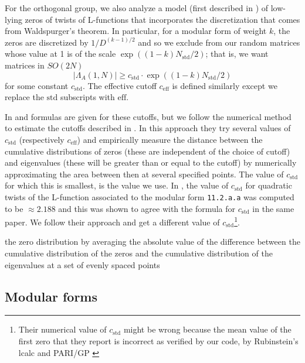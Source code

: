\documentclass[11pt]{amsart}
\newcommand     {\abs}[1]       {{\left\lvert{#1}\right\rvert}}
\newcommand{\eff}{\textrm{eff}}
\newcommand{\std}{\textrm{std}}
\begin{document}
For the orthogonal group, we also analyze a model (first described in \cite{DHKMS}) of low-lying zeros of twists of L-functions that incorporates the discretization that comes from Waldspurger's theorem.  In particular, for a modular form of weight $k$, the zeros are discretized by $1/D^{(k-1)/2}$ and so we exclude from our random matrices whose value at 1 is of the scale $\exp((1-k)N_\std/2)$; that is, we want matrices in $SO(2N)$
\[
\abs{\Lambda_A(1,N)} \geq c_\std\cdot \exp((1-k)N_\std/2)
\]
for some constant $c_\std$.  The effective cutoff $c_\eff$ is defined similarly except we replace the $\std$ subscripts with $\eff$.  

In \cite{DHKMS} and \cite{bm} formulas are given for these cutoffs, but we follow the numerical method to estimate the cutoffs described in \cite{DHKMS}.  In this approach they try several values of $c_\std$ (respectively $c_\eff$) and empirically measure the distance between the cumulative distributions of zeros (these are independent of the choice of cutoff) and eigenvalues (these will be greater than or equal to the cutoff) by numerically approximating the area between then at several specified points.  The value of $c_\std$ for which this is smallest, is the value we use.  In \cite{DHKMS}, the value of $c_\std$ for quadratic twists of the L-function associated to the modular form \texttt{11.2.a.a} was computed to be $\approx 2.188$ and this was shown to agree with the formula for $c_\std$ in the same paper.  We follow their approach and get a different value of $c_\std$\footnote{Their numerical value of $c_\std$ might be wrong because the mean value of the first zero that they report is incorrect as verified by our code, by Rubinstein's lcalc \cite{lcalc} and PARI/GP \cite{pari}}.

the zero distribution by averaging the
absolute value of the difference between the cumulative distribution of the zeros
and the cumulative distribution of the eigenvalues at a set of evenly spaced points

 
\subsection{Modular forms}
\end{document}
